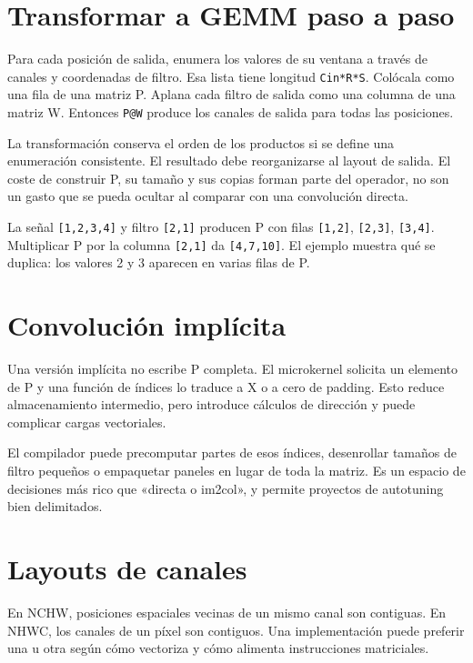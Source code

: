 \documentclass[12pt,a4paper,oneside]{report}
\begin{document}
\section{Transformar a GEMM paso a paso}
Para cada posición de salida, enumera los valores de su ventana a través de canales y coordenadas de filtro. Esa lista tiene longitud \texttt{Cin*R*S}. Colócala como una fila de una matriz P. Aplana cada filtro de salida como una columna de una matriz W. Entonces \texttt{P@W} produce los canales de salida para todas las posiciones.

La transformación conserva el orden de los productos si se define una enumeración consistente. El resultado debe reorganizarse al layout de salida. El coste de construir P, su tamaño y sus copias forman parte del operador, no son un gasto que se pueda ocultar al comparar con una convolución directa.

\begin{ejemplo}
La señal \texttt{[1,2,3,4]} y filtro \texttt{[2,1]} producen P con filas \texttt{[1,2]}, \texttt{[2,3]}, \texttt{[3,4]}. Multiplicar P por la columna \texttt{[2,1]} da \texttt{[4,7,10]}. El ejemplo muestra qué se duplica: los valores 2 y 3 aparecen en varias filas de P.

\end{ejemplo}
\section{Convolución implícita}
Una versión implícita no escribe P completa. El microkernel solicita un elemento de P y una función de índices lo traduce a X o a cero de padding. Esto reduce almacenamiento intermedio, pero introduce cálculos de dirección y puede complicar cargas vectoriales.

El compilador puede precomputar partes de esos índices, desenrollar tamaños de filtro pequeños o empaquetar paneles en lugar de toda la matriz. Es un espacio de decisiones más rico que «directa o im2col», y permite proyectos de autotuning bien delimitados.

\section{Layouts de canales}
En NCHW, posiciones espaciales vecinas de un mismo canal son contiguas. En NHWC, los canales de un píxel son contiguos. Una implementación puede preferir una u otra según cómo vectoriza y cómo alimenta instrucciones matriciales.
\end{document}
